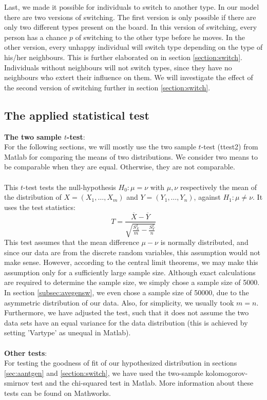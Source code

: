 Last, we made it possible for individuals to switch to another type.
In our model there are two versions of switching.
The first version is only possible if there are only two different types present on the board.
In this version of switching, every person has a chance $p$ of switching to the other type before he moves.
In the other version, every unhappy individual will switch type depending on the type of his/her neighbours.
This is further elaborated on in section \ref{section:switch}.
Individuals without neighbours will not switch types, since they have no neighbours who extert their influence on them.
We will investigate the effect of the second version of switching further in section \ref{section:switch}.
\subsection{The applied statistical test}\label{subsec:stattest}
\textbf{The two sample \(t\)-test}:\\
For the following sections, we will mostly use the two sample \(t\)-test (ttest2) from Matlab for comparing the means of two distributions. We consider two means to be comparable when they are equal. Otherwise, they are not comparable.\\
\\
This \(t\)-test tests the null-hypothesis $H_0:\mu=\nu$ with $\mu,\nu$ respectively the mean of the distribution of $X=(X_1,\dotsc,X_m)$ and $Y=(Y_1,\dotsc,Y_n)$, against $H_1:\mu\neq\nu$. It uses the test statistics:
 \[T=\frac{\overline{X}-\overline{Y}}{\sqrt{\frac{S^2_X}{m}-\frac{S^2_Y}{n}}}\]
This test assumes that the mean difference $\mu-\nu$ is normally distributed, and since our data are from the discrete random variables, this assumption would not make sense. 
However, according to the central limit theorems, we may make this assumption only for a sufficiently large sample size. 
Although exact calculations are required to determine the sample size, we simply chose a sample size of 5000. In section \ref{subsec:avegensw}, we even chose a sample size of 50000, due to the asymmetric distribution of our data. Also, for simplicity, we usually took $m=n$. Furthermore, we have adjusted the test, such that it does not assume the two data sets have an equal variance for the data distribution (this is achieved by setting 'Vartype' as unequal in Matlab).\\
\\
\textbf{Other tests}:\\
For testing the goodness of fit of our hypothesized distribution in sections \ref{sec:aantgen} and \ref{section:switch}, we have used the two-sample kolomogorov-smirnov test and the chi-squared test in Matlab. More information about these tests can be found on Mathworks.  


